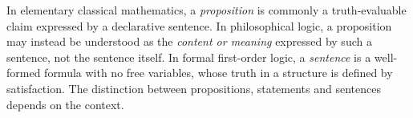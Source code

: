 
In elementary classical mathematics, a \emph{proposition} is commonly a truth-evaluable claim expressed by a declarative sentence. In philosophical logic, a proposition may instead be understood as the \emph{content or meaning} expressed by such a sentence, not the sentence itself. In formal first-order logic, a \emph{sentence} is a well-formed formula with no free variables, whose truth in a structure is defined by satisfaction. The distinction between propositions, statements and sentences depends on the context.
